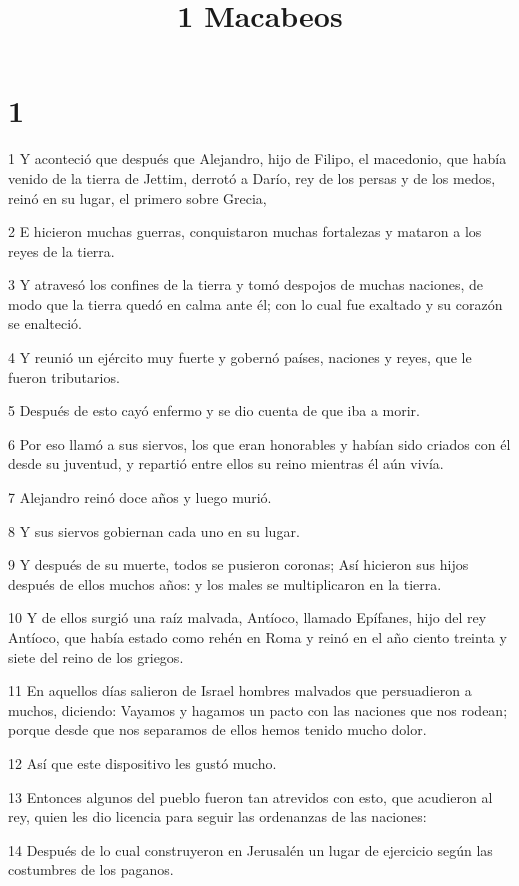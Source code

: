 

\title{1 Macabeos}

\chapter{1}

\par 1 Y aconteció que después que Alejandro, hijo de Filipo, el macedonio, que había venido de la tierra de Jettim, derrotó a Darío, rey de los persas y de los medos, reinó en su lugar, el primero sobre Grecia,
\par 2 E hicieron muchas guerras, conquistaron muchas fortalezas y mataron a los reyes de la tierra.
\par 3 Y atravesó los confines de la tierra y tomó despojos de muchas naciones, de modo que la tierra quedó en calma ante él; con lo cual fue exaltado y su corazón se enalteció.
\par 4 Y reunió un ejército muy fuerte y gobernó países, naciones y reyes, que le fueron tributarios.
\par 5 Después de esto cayó enfermo y se dio cuenta de que iba a morir.
\par 6 Por eso llamó a sus siervos, los que eran honorables y habían sido criados con él desde su juventud, y repartió entre ellos su reino mientras él aún vivía.
\par 7 Alejandro reinó doce años y luego murió.
\par 8 Y sus siervos gobiernan cada uno en su lugar.
\par 9 Y después de su muerte, todos se pusieron coronas; Así hicieron sus hijos después de ellos muchos años: y los males se multiplicaron en la tierra.
\par 10 Y de ellos surgió una raíz malvada, Antíoco, llamado Epífanes, hijo del rey Antíoco, que había estado como rehén en Roma y reinó en el año ciento treinta y siete del reino de los griegos.
\par 11 En aquellos días salieron de Israel hombres malvados que persuadieron a muchos, diciendo: Vayamos y hagamos un pacto con las naciones que nos rodean; porque desde que nos separamos de ellos hemos tenido mucho dolor.
\par 12 Así que este dispositivo les gustó mucho.
\par 13 Entonces algunos del pueblo fueron tan atrevidos con esto, que acudieron al rey, quien les dio licencia para seguir las ordenanzas de las naciones:
\par 14 Después de lo cual construyeron en Jerusalén un lugar de ejercicio según las costumbres de los paganos.
